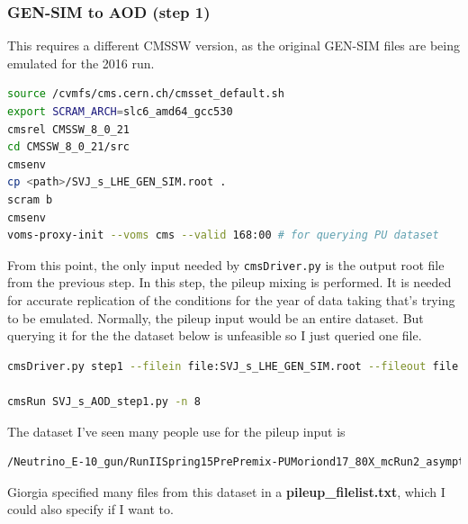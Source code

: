 \subsubsection{GEN-SIM to AOD (step 1)}

This requires a different CMSSW version, as the original GEN-SIM files are being emulated for the 2016 run.

\begin{lstlisting}[belowskip=-0.7cm, language=sh, numbers=none]
source /cvmfs/cms.cern.ch/cmsset_default.sh
export SCRAM_ARCH=slc6_amd64_gcc530
cmsrel CMSSW_8_0_21
cd CMSSW_8_0_21/src
cmsenv
cp <path>/SVJ_s_LHE_GEN_SIM.root .
scram b
cmsenv
voms-proxy-init --voms cms --valid 168:00 # for querying PU dataset
\end{lstlisting}

From this point, the only input needed by \texttt{cmsDriver.py} is the output root file from the previous step. In this step, the pileup mixing is performed. It is needed for accurate replication of the conditions for the year of data taking that's trying to be emulated. Normally, the pileup input would be an entire dataset. But querying it for the the dataset below is unfeasible so I just queried one file. 

\begin{lstlisting}[belowskip=-0.7cm, language=sh, numbers=none]
cmsDriver.py step1 --filein file:SVJ_s_LHE_GEN_SIM.root --fileout file:SVJ_s_AOD_step1.root --pileup_input /store/mc/RunIISpring15PrePremix/Neutrino_E-10_gun/GEN-SIM-DIGI-RAW/PUMoriond17_80X_mcRun2_asymptotic_2016_TrancheIV_v2-v2/100000/001EB167-3781-E611-BE3C-0CC47A4D75F4.root --mc --eventcontent PREMIXRAW --datatier GEN-SIM-RAW --conditions 80X_mcRun2_asymptotic_2016_TrancheIV_v6 --step DIGIPREMIX_S2,DATAMIX,L1,DIGI2RAW,HLT:@frozen2016 --datamix PreMix --era Run2_2016 --python_filename SVJ_s_AOD_step1.py --no_exec --customise Configuration/DataProcessing/Utils.addMonitoring -n 250

cmsRun SVJ_s_AOD_step1.py -n 8
\end{lstlisting}

The dataset I've seen many people use for the pileup input is

\begin{lstlisting}[belowskip=-0.7cm, language=sh, numbers=none]
/Neutrino_E-10_gun/RunIISpring15PrePremix-PUMoriond17_80X_mcRun2_asymptotic_2016_TrancheIV_v2-v2/GEN-SIM-DIGI-RAW
\end{lstlisting}

Giorgia specified many files from this dataset in a \textbf{pileup\_filelist.txt}, which I could also specify if I want to.


